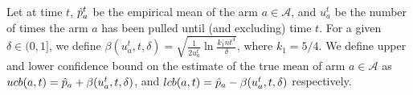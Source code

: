 

Let at time $t$, $\hat{p}_a^t$ be the empirical mean of the arm $a \in \mathcal{A}$,
and $u_a^t$ be the number of times the arm $a$ has been pulled
until (and excluding) time $t$. For a given $\delta \in (0,1]$, we define
$\beta(u_a^t, t, \delta) = \sqrt{\frac{1}{2u_a^t}\ln\frac{k_1 n t^4}{\delta}}$, where $k_1=5/4$.
We define upper and lower confidence bound on the estimate of the true
mean of arm $a \in \mathcal{A}$ as $ucb(a,t) = \hat{p}_a + \beta(u_a^t, t, \delta)$,
and $lcb(a,t) = \hat{p}_a - \beta(u_a^t, t, \delta)$ respectively.



